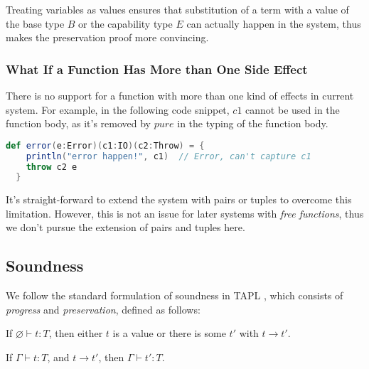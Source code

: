 Treating variables as values ensures that substitution of a term with
a value of the base type $B$ or the capability type $E$ can actually
happen in the system, thus makes the preservation proof more
convincing.


\subsubsection{What If a Function Has More than One Side Effect}

There is no support for a function with more than one kind of effects
in current system. For example, in the following code snippet, $c1$
cannot be used in the function body, as it's removed by $pure$ in the
typing of the function body.

\begin{lstlisting}[language=Scala]
  def error(e:Error)(c1:IO)(c2:Throw) = {
    println("error happen!", c1)  // Error, can't capture c1
    throw c2 e
  }
\end{lstlisting}

It's straight-forward to extend the system with pairs or tuples to
overcome this limitation. However, this is not an issue for later
systems with \emph{free functions}, thus we don't pursue the extension
of pairs and tuples here.

\subsection{Soundness}

\label{sec:stlc-pure-soundness}

We follow the standard formulation of soundness in TAPL
\cite{bpierce2002types}, which consists of \emph{progress} and
\emph{preservation}, defined as follows:

\begin{theorem}[Progress]
If $\varnothing \vdash t : T$, then either $t$ is a value or there is some
$t'$ with $t \longrightarrow t'$.
\end{theorem}

\begin{theorem}[Preservation]
If $\Gamma \vdash t : T$, and $t \longrightarrow t'$, then $\Gamma
\vdash t' : T$.
\end{theorem}

